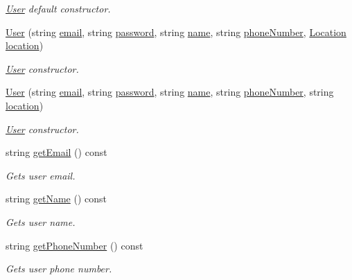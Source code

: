 \begin{DoxyCompactItemize}
\begin{DoxyCompactList}\small\item\em \hyperlink{class_user}{User} default constructor. \end{DoxyCompactList}\item 
\hyperlink{class_user_a7cc314f439fc19daa7303aa31f3e6798}{User} (string \hyperlink{class_user_a2d678acd22b533660b4b7d8404961f14}{email}, string \hyperlink{class_user_ab537b9a55bc7d7fcafcdf8e53d085e67}{password}, string \hyperlink{class_user_a643f85779a4693855c171c396f49e515}{name}, string \hyperlink{class_user_a727ba647fe019be6fa9c03308d60da9e}{phone\+Number}, \hyperlink{class_location}{Location} \hyperlink{class_user_a1c8e68a346c8a47d8cf0e75356c66562}{location})
\begin{DoxyCompactList}\small\item\em \hyperlink{class_user}{User} constructor. \end{DoxyCompactList}\item 
\hyperlink{class_user_aa0732588c5bd4db4f7f6310e788abacf}{User} (string \hyperlink{class_user_a2d678acd22b533660b4b7d8404961f14}{email}, string \hyperlink{class_user_ab537b9a55bc7d7fcafcdf8e53d085e67}{password}, string \hyperlink{class_user_a643f85779a4693855c171c396f49e515}{name}, string \hyperlink{class_user_a727ba647fe019be6fa9c03308d60da9e}{phone\+Number}, string \hyperlink{class_user_a1c8e68a346c8a47d8cf0e75356c66562}{location})
\begin{DoxyCompactList}\small\item\em \hyperlink{class_user}{User} constructor. \end{DoxyCompactList}\item 
string \hyperlink{class_user_ac8a15550f3596a7ef13eb31b82a8ecf6}{get\+Email} () const 
\begin{DoxyCompactList}\small\item\em Gets user email. \end{DoxyCompactList}\item 
string \hyperlink{class_user_a2b2a3d00d303affb4f5674bc9788db52}{get\+Name} () const 
\begin{DoxyCompactList}\small\item\em Gets user name. \end{DoxyCompactList}\item 
string \hyperlink{class_user_a4d59412a7d7411dd8c8127adc9e80fae}{get\+Phone\+Number} () const 
\begin{DoxyCompactList}\small\item\em Gets user phone number. \end{DoxyCompactList}\item 

\end{DoxyCompactItemize}
